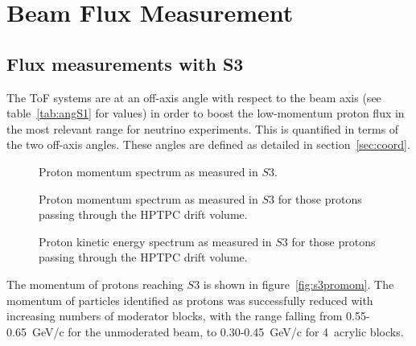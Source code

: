 \section{Beam Flux Measurement}
\label{hptpcPaper:sec:Results}

\subsection{Flux measurements with S3}

The ToF systems are at an off-axis angle with respect to the beam axis (see table~\ref{tab:angS1} for values) in order to boost the low-momentum proton flux in the most relevant range for neutrino experiments.
This is quantified in terms of the two off-axis angles.
These angles are defined as detailed in section~\ref{sec:coord}.

\begin{figure}[ht]
  \centering
  \begin{minipage}[t]{0.49\textwidth}
    \begin{adjustbox}{max totalsize={\textwidth}, center}
      
    \end{adjustbox}
    \caption{Proton momentum spectrum as measured in $\mathit{S3}$.}
    \label{fig:s3promom}
  \end{minipage}
  \hfill
  \begin{minipage}[t]{0.49\textwidth}
    \begin{adjustbox}{max totalsize={\textwidth}, center}
      
    \end{adjustbox}
    \caption{Proton momentum spectrum as measured in $\mathit{S3}$ for those protons passing through the HPTPC drift volume.}
    \label{fig:tpcpromom}
  \end{minipage}
\end{figure}

\begin{figure}[ht]
  \centering
  \begin{adjustbox}{max totalsize={0.5\textwidth}, center}
      
  \end{adjustbox}
  \caption{Proton kinetic energy spectrum as measured in $\mathit{S3}$ for those protons passing through the HPTPC drift volume.}
  \label{fig:tpcproke}
\end{figure}

The momentum of protons reaching $\mathit{S3}$ is shown in figure~\ref{fig:s3promom}. 
The momentum of particles identified as protons was successfully reduced with increasing numbers of moderator blocks, with the range falling from 0.55-0.65~GeV/c for the unmoderated beam, to 0.30-0.45~GeV/c for 4~acrylic blocks.

